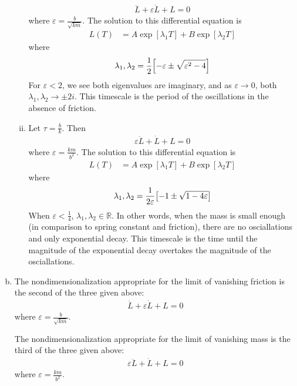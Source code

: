 \documentclass{article} %
\theoremstyle{plain}
\newcommand{\E}{\varepsilon}
\def\Rl{\mathbb{R}}
\numberwithin{equation}{section} %
\numberwithin{figure}{section} %
\numberwithin{table}{section} %
\begin{document}
\begin{enumerate}[(a)]
\begin{enumerate}[(i)]
\begin{align*}
                    \ddot{L} + \E\dot{L} + L = 0
                \end{align*}
                where $\E = \frac{b}{\sqrt{km}}$.  The solution to this differential equation is
                \begin{align*}
                    L(T) &= A\exp[\lambda_1 T] + B\exp[\lambda_2 T]
                \end{align*}
                where
                \begin{align*}
                    \lambda_1, \lambda_2 = \frac{1}{2}\qty[-\E \pm \sqrt{\E^2 - 4}]
                \end{align*}
                For $\E < 2$, we see both eigenvalues are imaginary, and as $\E \rightarrow 0$, both $\lambda_1,\lambda_2 \rightarrow \pm 2i$.  This timescale is the period of the oscillations in the absence of friction.
            \item
                Let $\tau = \frac{b}{k}$.  Then
                \begin{align*}
                    \E\ddot{L} + \dot{L} + L = 0
                \end{align*}
                where $\E = \frac{km}{b^2}$.  The solution to this differential equation is
                \begin{align*}
                    L(T) &= A\exp[\lambda_1 T] + B\exp[\lambda_2 T]
                \end{align*}
                where
                \begin{align*}
                    \lambda_1, \lambda_2 = \frac{1}{2\E}\qty[-1 \pm \sqrt{1 - 4\E}]
                \end{align*}
                When $\E < \frac{1}{4}$, $\lambda_1,\lambda_2 \in \Rl$.  In other words, when the mass is small enough (in comparison to spring constant and friction), there are no osciallations and only exponential decay.  This timescale is the time until the magnitude of the exponential decay overtakes the magnitude of the osciallations.
        \end{enumerate}
    \item
        The nondimensionalization appropriate for the limit of vanishing friction is the second of the three given above:
        \begin{align*}
            \ddot{L} + \E\dot{L} + L = 0
        \end{align*}
        where $\E = \frac{b}{\sqrt{km}}$.

        The nondimensionalization appropriate for the limit of vanishing mass is the third of the three given above:
        \begin{align*}
            \E\ddot{L} + \dot{L} + L = 0
        \end{align*}
        where $\E = \frac{km}{b^2}$.
\end{enumerate}
\end{document}
